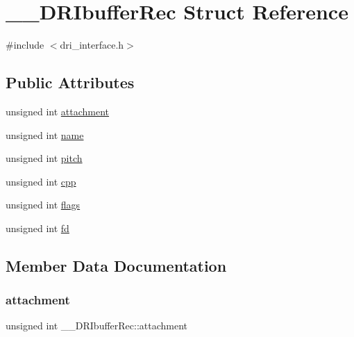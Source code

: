 \hypertarget{struct_____d_r_ibuffer_rec}{}\section{\+\_\+\+\_\+\+D\+R\+Ibuffer\+Rec Struct Reference}
\label{struct_____d_r_ibuffer_rec}


{\ttfamily \#include $<$dri\+\_\+interface.\+h$>$}

\subsection*{Public Attributes}
\begin{DoxyCompactItemize}
\item 
unsigned int \hyperlink{struct_____d_r_ibuffer_rec_aa7c5162b98faab916773747f6049f2aa}{attachment}
\item 
unsigned int \hyperlink{struct_____d_r_ibuffer_rec_a7b6270c8073fcd89d9c1f0a2e1484a55}{name}
\item 
unsigned int \hyperlink{struct_____d_r_ibuffer_rec_a3ca39b391b5c70991eceecfe24680d01}{pitch}
\item 
unsigned int \hyperlink{struct_____d_r_ibuffer_rec_ae4229532ca9a93caf4e3a548d2591255}{cpp}
\item 
unsigned int \hyperlink{struct_____d_r_ibuffer_rec_ab0bf0cf0495bc1d86b152b9236245c06}{flags}
\item 
unsigned int \hyperlink{struct_____d_r_ibuffer_rec_ac47f52c4941d17bb74ee90e7e1243792}{fd}
\end{DoxyCompactItemize}


\subsection{Member Data Documentation}
\mbox{\label{struct_____d_r_ibuffer_rec_aa7c5162b98faab916773747f6049f2aa}} 
\subsubsection{\texorpdfstring{attachment}{attachment}}
{\footnotesize\ttfamily unsigned int \+\_\+\+\_\+\+D\+R\+Ibuffer\+Rec\+::attachment}


